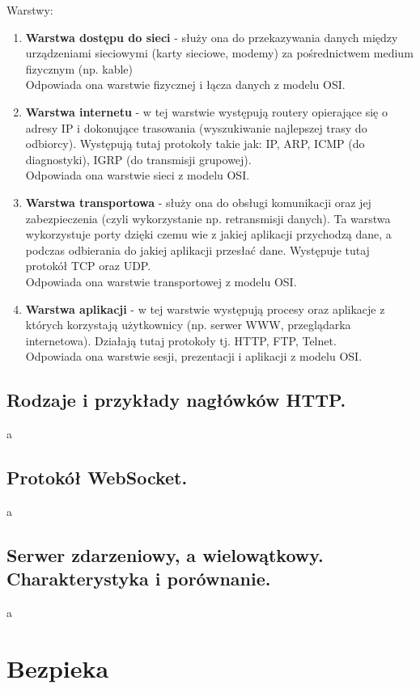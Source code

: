 \documentclass[a4paper,12pt,oneside]{book}
\begin{document}
			Warstwy:
			\begin{enumerate}
				\item \textbf{Warstwa dostępu do sieci} - służy ona do przekazywania danych między
				urządzeniami sieciowymi (karty sieciowe, modemy) za pośrednictwem medium
				fizycznym (np. kable)\\
				Odpowiada ona warstwie fizycznej i łącza danych z modelu OSI.
				\item \textbf{Warstwa internetu} - w tej warstwie występują routery opierające się o adresy IP i
				dokonujące trasowania (wyszukiwanie najlepszej trasy do odbiorcy).
				Występują tutaj protokoły takie jak: IP, ARP, ICMP (do diagnostyki), IGRP (do
				transmisji grupowej).\\
				Odpowiada ona warstwie sieci z modelu OSI.
				\item \textbf{Warstwa transportowa} - służy ona do obsługi komunikacji oraz jej zabezpieczenia
				(czyli wykorzystanie np. retransmisji danych). Ta warstwa wykorzystuje porty dzięki
				czemu wie z jakiej aplikacji przychodzą dane, a podczas odbierania do jakiej aplikacji
				przesłać dane. Występuje tutaj protokół TCP oraz UDP.\\
				Odpowiada ona warstwie transportowej z modelu OSI.
				\item \textbf{Warstwa aplikacji} - w tej warstwie występują procesy oraz aplikacje z których
				korzystają użytkownicy (np. serwer WWW, przeglądarka internetowa). Działają tutaj
				protokoły tj. HTTP, FTP, Telnet.\\
				Odpowiada ona warstwie sesji, prezentacji i aplikacji z modelu OSI.
			\end{enumerate}
			
			\newpage\subsection{\color{red}Rodzaje i przykłady nagłówków HTTP.}
				a
			\newpage\subsection{\color{red}Protokół WebSocket.}
				a
			\newpage\subsection{\color{red}Serwer zdarzeniowy, a wielowątkowy. Charakterystyka i porównanie.}
				a
		
		\newpage\section{Bezpieka}
\end{document}
